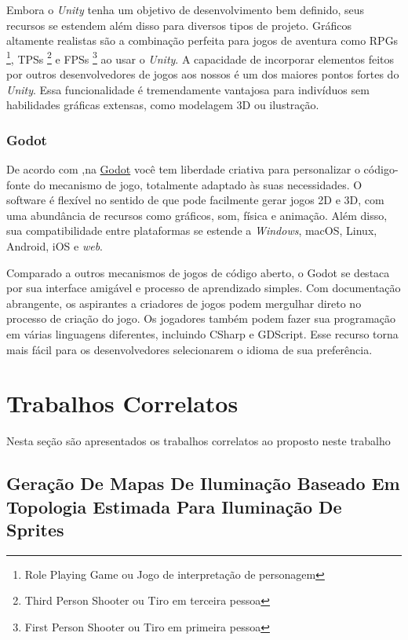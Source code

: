 Embora o \textit{Unity} tenha um objetivo de desenvolvimento bem definido, seus recursos se estendem além disso para diversos tipos de projeto.  Gráficos altamente realistas são a combinação perfeita para jogos de aventura como RPGs \footnote{Role Playing Game ou Jogo de interpretação de personagem}, TPSs \footnote{Third Person Shooter ou Tiro em terceira pessoa} e FPSs \footnote{First Person Shooter ou Tiro em primeira pessoa} ao usar o \textit{Unity}.  A capacidade de incorporar elementos feitos por outros desenvolvedores de jogos aos nossos é um dos maiores pontos fortes do \textit{Unity}.  Essa funcionalidade é tremendamente vantajosa para indivíduos sem habilidades gráficas extensas, como modelagem 3D ou ilustração.

\subsubsection{Godot}

De acordo com ,na \href{https://unity.com/pt}{Godot} você tem liberdade criativa para personalizar o código-fonte do mecanismo de jogo, totalmente adaptado às suas necessidades.  O software é flexível no sentido de que pode facilmente gerar jogos 2D e 3D, com uma abundância de recursos como gráficos, som, física e animação.  Além disso, sua compatibilidade entre plataformas se estende a \textit{Windows}, macOS, Linux, Android, iOS e \textit{web}.

Comparado a outros mecanismos de jogos de código aberto, o Godot se destaca por sua interface amigável e processo de aprendizado simples.  Com documentação abrangente, os aspirantes a criadores de jogos podem mergulhar direto no processo de criação do jogo.  Os jogadores também podem fazer sua programação em várias linguagens diferentes, incluindo CSharp e GDScript.  Esse recurso torna mais fácil para os desenvolvedores selecionarem o idioma de sua preferência.

\section{Trabalhos Correlatos}

Nesta seção são apresentados os trabalhos correlatos ao proposto neste trabalho

\subsection{Geração De Mapas De Iluminação Baseado Em Topologia Estimada Para Iluminação De Sprites}

